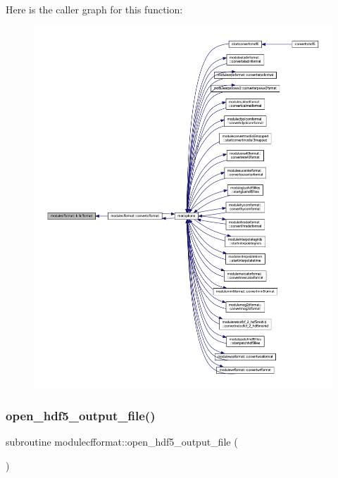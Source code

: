 Here is the caller graph for this function\+:\nopagebreak
\begin{figure}[H]
\begin{center}
\leavevmode
\includegraphics[width=350pt]{namespacemodulecfformat_ac518bd16572e1cf72041996bfd3d1e36_icgraph}
\end{center}
\end{figure}
\mbox{\label{namespacemodulecfformat_ac77aa80bb4743d920e0a70e5b278be5d}} 
\subsubsection{\texorpdfstring{open\+\_\+hdf5\+\_\+output\+\_\+file()}{open\_hdf5\_output\_file()}}
{\footnotesize\ttfamily subroutine modulecfformat\+::open\+\_\+hdf5\+\_\+output\+\_\+file (\begin{DoxyParamCaption}{ }\end{DoxyParamCaption})\hspace{0.3cm}{\ttfamily [private]}}

